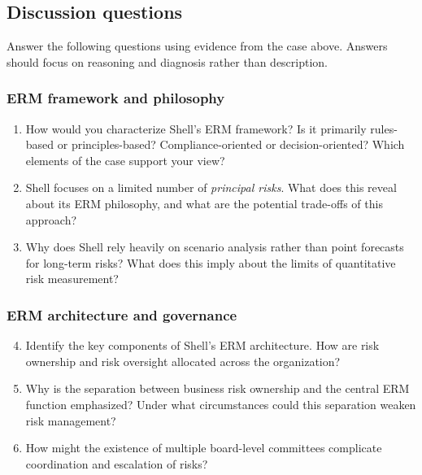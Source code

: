\documentclass[11pt]{article}
\begin{document}
\subsection*{Discussion questions}

Answer the following questions using evidence from the case above. Answers
should focus on reasoning and diagnosis rather than description.

\subsubsection*{ERM framework and philosophy}

\begin{enumerate}
  \item How would you characterize Shell’s ERM framework?
  Is it primarily rules-based or principles-based? Compliance-oriented or
  decision-oriented? Which elements of the case support your view?

  \item Shell focuses on a limited number of \emph{principal risks}.
  What does this reveal about its ERM philosophy, and what are the potential
  trade-offs of this approach?

  \item Why does Shell rely heavily on scenario analysis rather than point
  forecasts for long-term risks? What does this imply about the limits of
  quantitative risk measurement?
\end{enumerate}

\subsubsection*{ERM architecture and governance}

\begin{enumerate}
  \setcounter{enumi}{3}
  \item Identify the key components of Shell’s ERM architecture.
  How are risk ownership and risk oversight allocated across the organization?

  \item Why is the separation between business risk ownership and the central
  ERM function emphasized? Under what circumstances could this separation
  weaken risk management?

  \item How might the existence of multiple board-level committees complicate
  coordination and escalation of risks?
\end{enumerate}
\end{document}
